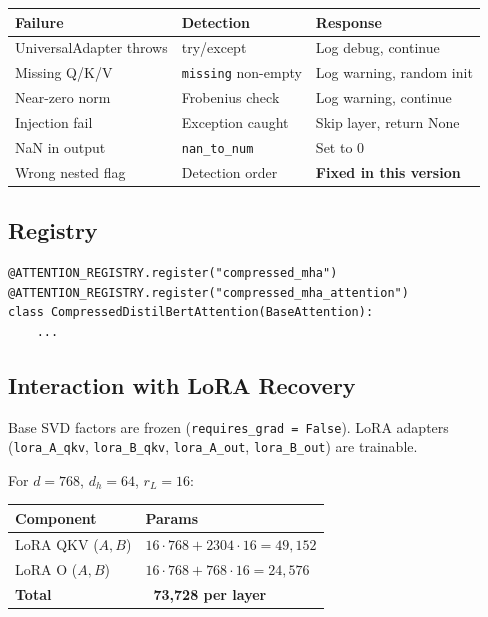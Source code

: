 \begin{table}[H]
\centering
\small
\begin{tabular}{lll}
\toprule
\textbf{Failure} & \textbf{Detection} & \textbf{Response} \\
\midrule
UniversalAdapter throws & try/except & Log debug, continue \\
Missing Q/K/V & \texttt{missing} non-empty & Log warning, random init \\
Near-zero norm & Frobenius check & Log warning, continue \\
Injection fail & Exception caught & Skip layer, return None \\
NaN in output & \texttt{nan\_to\_num} & Set to 0 \\
Wrong nested flag & Detection order & \textbf{Fixed in this version} \\
\bottomrule
\end{tabular}
\end{table}

\subsection{Registry}

\begin{lstlisting}
@ATTENTION_REGISTRY.register("compressed_mha")
@ATTENTION_REGISTRY.register("compressed_mha_attention")
class CompressedDistilBertAttention(BaseAttention):
    ...
\end{lstlisting}

\subsection{Interaction with LoRA Recovery}

Base SVD factors are frozen (\texttt{requires\_grad = False}). LoRA adapters 
(\texttt{lora\_A\_qkv}, \texttt{lora\_B\_qkv}, \texttt{lora\_A\_out}, \texttt{lora\_B\_out}) are trainable.

For $d = 768$, $d_h = 64$, $r_L = 16$:

\begin{table}[H]
\centering
\small
\begin{tabular}{ll}
\toprule
\textbf{Component} & \textbf{Params} \\
\midrule
LoRA QKV ($A, B$) & $16 \cdot 768 + 2304 \cdot 16 = 49,152$ \\
LoRA O ($A, B$) & $16 \cdot 768 + 768 \cdot 16 = 24,576$ \\
\textbf{Total} & \textbf{~73,728 per layer} \\
\bottomrule
\end{tabular}
\end{table}

